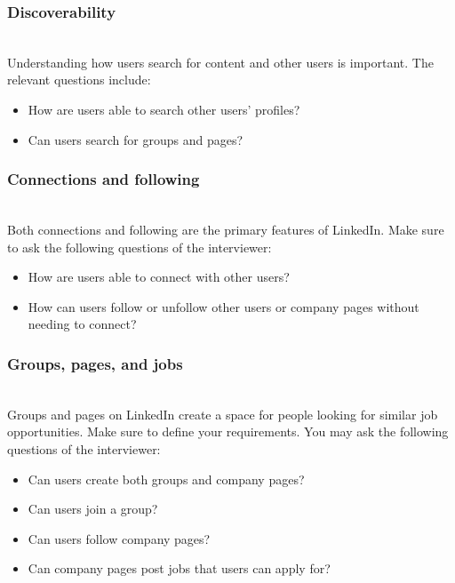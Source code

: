 \subsubsection{Discoverability}\label{fKB2IFGj6alsP5vMPty6f}
\\
Understanding how users search for content and other users is important. The relevant questions include:

\begin{itemize}
\item
\protect{}\label{2J3pTA0h4L4bgYqMvsmZ0}
How are users able to search other users' profiles?
\item
\protect{}\label{A-9Zih7q5Rq_bECxVWCs5}
Can users search for groups and pages?
\end{itemize}

\subsubsection{Connections and following}\label{O0AvnObqEMkbA7isfb-Nz}
\\
Both connections and following are the primary features of LinkedIn. Make sure to ask the following questions of the interviewer:

\begin{itemize}
\item
How are users able to connect with other users?
\item
How can users follow or unfollow other users or company pages without needing to connect?
\end{itemize}

\subsubsection{Groups, pages, and jobs}\label{pqj0477HbElhoOwfLIuYF}
\\
Groups and pages on LinkedIn create a space for people looking for similar job opportunities. Make sure to define your requirements. You may ask the following questions of the interviewer:

\begin{itemize}
\item
\protect{}\label{1vUCXAfis_vqykq_q3HLI}
Can users create both groups and company pages?
\item
\protect{}\label{scw5UOrNkBVt5_5HTGDVZ}
Can users join a group?
\item
\protect{}\label{4k5m_VbmBbUeb9Nl1rfK-}
Can users follow company pages?
\item
\protect{}\label{JO_zEKrOom5mIQlMtjq_V}
Can company pages post jobs that users can apply for?
\end{itemize}

